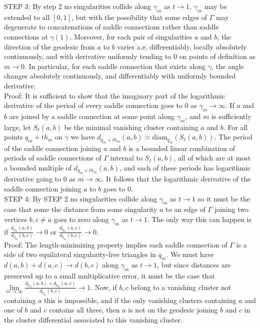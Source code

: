 \documentclass[12pt]{article}
\newcommand{\diam}{\mathrm{diam}}
\begin{document}
\noindent STEP 3: By step 2 no singularities collide along $\gamma_m$ as $t \to 1$, $\gamma_m$ may be extended to all $[0,1]$, but with the possibility that some edges of $\Gamma$ may degenerate to concatenations of saddle connections rather than saddle connections at $\gamma(1)$. Moreover, for each pair of singularities $a$ and $b$, the direction of the geodesic from $a$ to $b$ varies a.e. differentiably, locally absolutely continuously, and with derivative uniformly tending to $0$ on points of definition as $m \to 0$. In particular, for each saddle connection that exists along $\gamma$, the angle changes absolutely continuously, and differentiably with uniformly bounded derivative.\\

\noindent Proof: It is sufficient to show that the imaginary part of the logarithmic derivative of the period of every saddle connection goes to $0$ as $\gamma_m \to \infty$. If $a$ and $b$ are joined by a saddle connection at some point along $\gamma_m$, and $m$ is sufficiently large, let $S_\ell(a,b)$ be the minimal vanishing cluster containing $a$ and $b$. For all points $q_m + t h_m$ on $\gamma$ we have $d_{q_m + t h_m}(a,b) \dot{\asymp} \diam_{q_m}(S_\ell(a,b))$. The period of the saddle connection joining $a$ and $b$ is a bounded linear combination of periods of saddle connections of $\Gamma$ internal to $S_\ell(a,b)$, all of which are at most a bounded multiple of $d_{q_m + t h_m}(a,b)$, and each of these periods has logarithmic derivative going to $0$ as $m \to \infty$. It follows that the logarithmic derivative of the saddle connection joining $a$ to $b$ goes to $0$.\\

\noindent STEP 4: By STEP 2 no singularities collide along $\gamma_m$ as $t \to 1$ so it must be the case that some the distance from some singularity $a$ to an edge of $\Gamma$ joining two vertices $b,c \neq a$ goes to zero along $\gamma_m$ as $t \to 1$. The only way this can happen is if $\frac{d_{q_m}(a,b)}{d_{q_m}(b,c)} \to 0$ or $\frac{d_{q_m}(a,c)}{d_{q_m}(b,c)} \to 0$.\\

\noindent Proof: The length-minimizing property implies each saddle connection of $\Gamma$ is a side of two equilateral singularity-free triangles in $q_m$. We must have $d(a,b) + d(a,c) \to d(b,c)$ along $\gamma_m$ as $t \to 1$, but since distances are preserved up to a small multiplicative error, it must be the case that $\lim\limits_{m \to \infty} \frac{d_{q_m}(a,b) + d_{q_m}(a,c)}{d_{q_m}(b,c)} \to 1$. Now, if $b,c$ belong to a vanishing cluster not containing $a$ this is impossible, and if the only vanishing clusters containing $a$ and one of $b$ and $c$ contains all three, then $a$ is not on the geodesic joining $b$ and $c$ in the cluster differential associated to this vanishing cluster.\\
\end{document}
